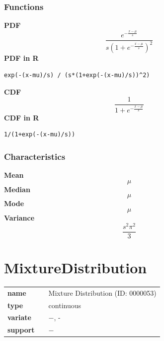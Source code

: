 \subsubsection*{Functions}

\smallskip \noindent \hspace{.2cm} \textbf{PDF} 
\begin{equation*}\frac{e^{-\frac{x-\mu}{s}}} {s\left(1+e^{-\frac{x-\mu}{s}}\right)^2}\end{equation*}
\smallskip \noindent \hspace{.2cm} \textbf{PDF in R}  
\begin{verbatim}exp(-(x-mu)/s) / (s*(1+exp(-(x-mu)/s))^2)\end{verbatim}
\smallskip \noindent \hspace{.2cm} \textbf{CDF} 
\begin{equation*}\frac{1}{1+e^{-\frac{x-\mu}{s}}}\end{equation*}
\smallskip \noindent \hspace{.2cm} \textbf{CDF in R} 
\begin{verbatim}1/(1+exp(-(x-mu)/s))\end{verbatim}
\smallskip
\subsubsection*{Characteristics}
\smallskip \noindent \hspace{.2cm} \textbf{Mean} 
\begin{equation*}\mu\end{equation*}
\smallskip \noindent \hspace{.2cm} \textbf{Median} 
\begin{equation*}\mu\end{equation*}
\smallskip \noindent \hspace{.2cm} \textbf{Mode} 
\begin{equation*}\mu\end{equation*}
\smallskip \noindent \hspace{.2cm} \textbf{Variance} 
\begin{equation*}\frac{s^2 \pi^2}{3}\end{equation*}
\smallskip
\section*{MixtureDistribution} 

  \bigskip 

\begin{tabular}{p{2cm}cl}
\textbf{name} & & Mixture Distribution (ID: 0000053)\\ 
 
\textbf{type} & & continuous \\ 

\textbf{variate} & & $-$, - \\ 

\textbf{support} & & $-$
\end{tabular}

